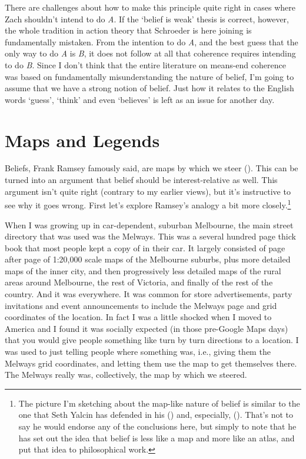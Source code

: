 \documentclass[
  10pt,
  letterpaper,
  twoside]{scrbook}
\begin{document}
There are challenges about how to make this principle quite right in
cases where Zach shouldn't intend to do \emph{A}. If the `belief is
weak' thesis is correct, however, the whole tradition in action theory
that Schroeder is here joining is fundamentally mistaken. From the
intention to do \emph{A}, and the best guess that the only way to do
\emph{A} is \emph{B}, it does not follow at all that coherence requires
intending to do \emph{B}. Since I don't think that the entire literature
on means-end coherence was based on fundamentally misunderstanding the
nature of belief, I'm going to assume that we have a strong notion of
belief. Just how it relates to the English words `guess', `think' and
even `believes' is left as an issue for another day.

\section{Maps and Legends}\label{sec-mapslegends}

Beliefs, Frank Ramsey famously said, are maps by which we steer
(). This can be
turned into an argument that belief should be interest-relative as well.
This argument isn't quite right (contrary to my earlier views), but it's
instructive to see why it goes wrong. First let's explore Ramsey's
analogy a bit more closely.\footnote{The picture I'm sketching about the
  map-like nature of belief is similar to the one that Seth Yalcin has
  defended in his () and, especially,
  (). That's not to say he would endorse
  any of the conclusions here, but simply to note that he has set out
  the idea that belief is less like a map and more like an atlas, and
  put that idea to philosophical work.}

When I was growing up in car-dependent, suburban Melbourne, the main
street directory that was used was the Melways. This was a several
hundred page thick book that most people kept a copy of in their car. It
largely consisted of page after page of 1:20,000 scale maps of the
Melbourne suburbs, plus more detailed maps of the inner city, and then
progressively less detailed maps of the rural areas around Melbourne,
the rest of Victoria, and finally of the rest of the country. And it was
everywhere. It was common for store advertisements, party invitations
and event announcements to include the Melways page and grid coordinates
of the location. In fact I was a little shocked when I moved to America
and I found it was socially expected (in those pre-Google Maps days)
that you would give people something like turn by turn directions to a
location. I was used to just telling people where something was, i.e.,
giving them the Melways grid coordinates, and letting them use the map
to get themselves there. The Melways really was, collectively, the map
by which we steered.
\end{document}
